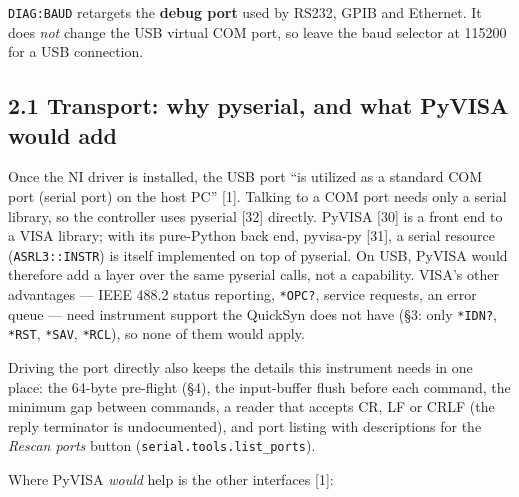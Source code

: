 \documentclass[
\directlua{luaotfload.add_fallback("qsfallback", {"DejaVu Sans:mode=harf;", "DejaVu Sans Mono:mode=harf;", "DejaVu Math TeX Gyre:mode=harf;"})}
  10pt,
  letterpaper,
]{article}
\begin{document}
\texttt{DIAG:BAUD} retargets the \textbf{debug port} used by RS232, GPIB
and Ethernet. It does \emph{not} change the USB virtual COM port, so
leave the baud selector at 115200 for a USB connection.

\hypertarget{transport-why-pyserial-and-what-pyvisa-would-add}{%
\subsection{2.1 Transport: why pyserial, and what PyVISA would
add}\label{transport-why-pyserial-and-what-pyvisa-would-add}}

Once the NI driver is installed, the USB port ``is utilized as a
standard COM port (serial port) on the host PC'' {[}1{]}. Talking to a
COM port needs only a serial library, so the controller uses pyserial
{[}32{]} directly. PyVISA {[}30{]} is a front end to a VISA library;
with its pure-Python back end, pyvisa-py {[}31{]}, a serial resource
(\texttt{ASRL3::INSTR}) is itself implemented on top of pyserial. On
USB, PyVISA would therefore add a layer over the same pyserial calls,
not a capability. VISA's other advantages --- IEEE 488.2 status
reporting, \texttt{*OPC?}, service requests, an error queue --- need
instrument support the QuickSyn does not have (§3: only \texttt{*IDN?},
\texttt{*RST}, \texttt{*SAV}, \texttt{*RCL}), so none of them would
apply.

Driving the port directly also keeps the details this instrument needs
in one place: the 64-byte pre-flight (§4), the input-buffer flush before
each command, the minimum gap between commands, a reader that accepts
CR, LF or CRLF (the reply terminator is undocumented), and port listing
with descriptions for the \emph{Rescan ports} button
(\texttt{serial.tools.list\_ports}).

Where PyVISA \emph{would} help is the other interfaces {[}1{]}:
\end{document}
